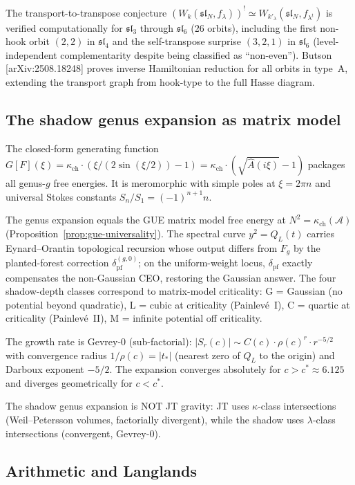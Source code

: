 \documentclass[11pt]{article}
\newcommand{\cA}{\mathcal{A}}
\begin{document}
The transport-to-transpose conjecture
$(W_k(\mathfrak{sl}_N, f_\lambda))^! \simeq
W_{k'_\lambda}(\mathfrak{sl}_N, f_{\lambda^t})$
is verified computationally for $\mathfrak{sl}_3$ through
$\mathfrak{sl}_6$ (26 orbits), including the first non-hook
orbit $(2,2)$ in $\mathfrak{sl}_4$ and the self-transpose
surprise $(3,2,1)$ in $\mathfrak{sl}_6$ (level-independent
complementarity despite being classified as ``non-even'').
Butson [arXiv:2508.18248] proves inverse Hamiltonian reduction
for all orbits in type~A, extending the transport graph from
hook-type to the full Hasse diagram.

\subsection{The shadow genus expansion as matrix model}

The closed-form generating function
$G[F](\xi) = \kappa_{\mathrm{ch}} \cdot (\xi/(2\sin(\xi/2)) - 1)
= \kappa_{\mathrm{ch}} \cdot (\sqrt{\hat{A}(i\xi)} - 1)$
packages all genus-$g$ free energies. It is meromorphic with
simple poles at $\xi = 2\pi n$ and universal Stokes constants
$S_n / S_1 = (-1)^{n+1} n$.

The genus expansion equals the GUE matrix model free energy at
$N^2 = \kappa_{\mathrm{ch}}(\cA)$ (Proposition~\ref{prop:gue-universality}).
The spectral curve $y^2 = Q_L(t)$ carries Eynard--Orantin
topological recursion whose output differs from $F_g$ by the
planted-forest correction $\delta_{\mathrm{pf}}^{(g,0)}$;
on the uniform-weight locus, $\delta_{\mathrm{pf}}$ exactly
compensates the non-Gaussian CEO, restoring the Gaussian answer.
The four shadow-depth classes correspond to matrix-model
criticality: G = Gaussian (no potential beyond quadratic),
L = cubic at criticality (Painlev\'e~I), C = quartic at
criticality (Painlev\'e~II), M = infinite potential off
criticality.

The growth rate is Gevrey-$0$ (sub-factorial):
$|S_r(c)| \sim C(c) \cdot \rho(c)^r \cdot r^{-5/2}$
with convergence radius $1/\rho(c) = |t_*|$ (nearest zero
of $Q_L$ to the origin) and Darboux exponent $-5/2$.
The expansion converges absolutely for
$c > c^* \approx 6.125$ and diverges geometrically for
$c < c^*$.

The shadow genus expansion is NOT JT gravity:
JT uses $\kappa$-class intersections (Weil--Petersson
volumes, factorially divergent), while the shadow uses
$\lambda$-class intersections (convergent, Gevrey-$0$).

\subsection{Arithmetic and Langlands}
\end{document}
